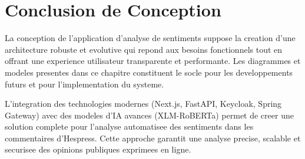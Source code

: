 \section{Conclusion de Conception}

La conception de l'application d'analyse de sentiments suppose la creation d'une architecture robuste et evolutive qui repond aux besoins fonctionnels tout en offrant une experience utilisateur transparente et performante. Les diagrammes et modeles presentes dans ce chapitre constituent le socle pour les developpements futurs et pour l'implementation du systeme.

L'integration des technologies modernes (Next.js, FastAPI, Keycloak, Spring Gateway) avec des modeles d'IA avances (XLM-RoBERTa) permet de creer une solution complete pour l'analyse automatisee des sentiments dans les commentaires d'Hespress. Cette approche garantit une analyse precise, scalable et securisee des opinions publiques exprimees en ligne.

